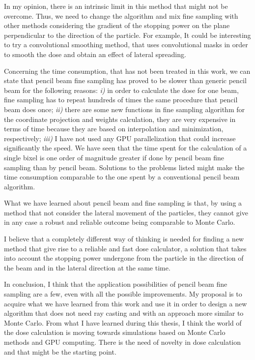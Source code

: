 \documentclass[12pt, a4paper, twoside]{book}
\begin{document}
In my opinion, there is an intrinsic limit in this method that might not be overcome. Thus, we need to change the algorithm and mix fine sampling with other methods considering the gradient of the stopping power on the plane perpendicular to the direction of the particle. For example, It could be interesting to try a convolutional smoothing method, that uses convolutional masks in order to smooth the dose and obtain an effect of lateral spreading.

Concerning the time consumption, that has not been treated in this work, we can state that pencil beam fine sampling has proved to be slower than generic pencil beam for the following reasons: \emph{i)} in order to calculate the dose for one beam, fine sampling has to repeat hundreds of times the same procedure that pencil beam does once; \emph{ii)} there are some new functions in fine sampling algorithm for the coordinate projection and weights calculation, they are very expensive in terms of time because they are based on interpolation and minimization, respectively; \emph{iii)} I have not used any GPU parallelization that could increase significantly the speed.
We have seen that the time spent for the calculation of a single bixel is one order of magnitude greater if done by pencil beam fine sampling than by pencil beam.
Solutions to the problems listed might make the time consumption comparable to the one spent by a conventional pencil beam algorithm.

What we have learned about pencil beam and fine sampling is that, by using a method that not consider the lateral movement of the particles, they cannot give in any case a robust and reliable outcome being comparable to Monte Carlo.

I believe that a completely different way of thinking is needed for finding a new method that give rise to a reliable and fast dose calculator, a solution that takes into account the stopping power undergone from the particle in the direction of the beam and in the lateral direction at the same time. 


In conclusion, I think that the application possibilities of pencil beam fine sampling are a few, even with all the possible improvements. My proposal is to acquire what we have learned from this work and use it in order to design a new algorithm that does not need ray casting and with an approach more similar to Monte Carlo. From what I have learned during this thesis, I think the world of the dose calculation is moving towards simulations based on Monte Carlo methods and GPU computing. There is the need of novelty in dose calculation and that might be the starting point.
\end{document}
